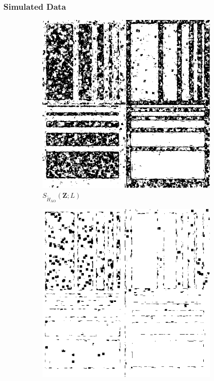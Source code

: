\documentclass[aspectratio=1610,10pt]{beamer}
\begin{document}
\begin{frame} \frametitle{\large{Simulated Data }}\vspace{-0.1cm}

\begin{figure}[H]
  \centering
  \begin{subfigure}[b]{0.3\textwidth}
    \centering
    \includegraphics[width=\textwidth]{../../Figures/PNG/H_005_Phantom_4_z1_AO_200b}
    \caption{$S_{\widetilde{H}_{\text{AO}}}(\bm{Z}; L)$}
    \label{fig:sim_SAR_Images_p05-1}
  \end{subfigure}
  \hfill
  \begin{subfigure}[b]{0.3\textwidth}
    \centering
    \includegraphics[width=\textwidth]{../../Figures/PNG/cv_005_pvalues_Phantom_4_z1}

\end{subfigure}
\end{figure}
\end{frame}
\end{document}
